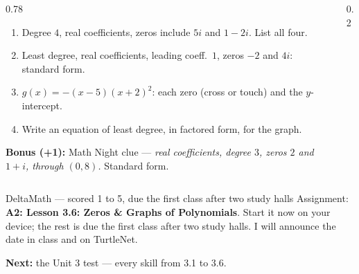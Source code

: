 \documentclass[aspectratio=169, 11pt]{beamer}
\newcommand{\pgrid}[5]{%
  \draw[linegray!45, very thin, xstep=1, ystep=#5] (#1,#3) grid (#2,#4);
  \draw[->, semithick, charcoal] (#1,0)--(#2,0) node[right, font=\tiny, inner sep=1pt]{$x$};
  \draw[->, semithick, charcoal] (0,#3)--(0,#4) node[above, font=\tiny, inner sep=1pt]{$y$};}
\newcommand{\pcurve}[5]{%
  \begin{scope}\clip (#1,#3) rectangle (#2,#4);
    \draw[very thick, forest, domain=#1:#2, samples=160, smooth] plot (\x,{#5});
  \end{scope}}
\newcommand{\xtick}[1]{\foreach \t in {#1}{%
  \draw[charcoal] (\t,0) +(0,-2pt) -- +(0,2pt);
  \node[below, font=\tiny, inner sep=1.5pt, fill=white, fill opacity=0.8, text opacity=1]
    at (\t,0) {$\t$};}}
\newcommand{\ytick}[1]{\foreach \t in {#1}{%
  \draw[charcoal] (0,\t) +(-2pt,0) -- +(2pt,0);
  \node[left, font=\tiny, inner sep=1.5pt, fill=white, fill opacity=0.8, text opacity=1]
    at (0,\t) {$\t$};}}
\begin{document}
\begin{frame}[t, plain]
  \begin{columns}[T]
    \begin{column}{0.78\textwidth}
      {\footnotesize
      \begin{enumerate}\setlength{\itemsep}{0pt}
        \item Degree $4$, real coefficients, zeros include $5i$ and $1-2i$. List all four.
        \item Least degree, real coefficients, leading coeff.\ $1$, zeros $-2$ and $4i$: standard form.
        \item $g(x)=-(x-5)(x+2)^2$: each zero (cross or touch) and the $y$-intercept.
        \item Write an equation of least degree, in factored form, for the graph.
      \end{enumerate}
      \textbf{Bonus (+1):} Math Night clue --- \emph{real coefficients, degree $3$, zeros $2$
      and $1+i$, through $(0,8)$.} Standard form.}
    \end{column}
    \begin{column}{0.2\textwidth}
      \centering
    \end{column}
  \end{columns}
\end{frame}

\begin{frame}[t, plain]
  \begin{block}{DeltaMath --- scored 1 to 5, due the first class after two study halls}
    Assignment: \textbf{A2: Lesson 3.6: Zeros \& Graphs of Polynomials}. Start it now on your
    device; the rest is due the first class after two study halls. I will announce the date in
    class and on TurtleNet.
  \end{block}
  \vspace{6pt}
  \textbf{Next:} the Unit 3 test --- every skill from 3.1 to 3.6.
\end{frame}
\end{document}
